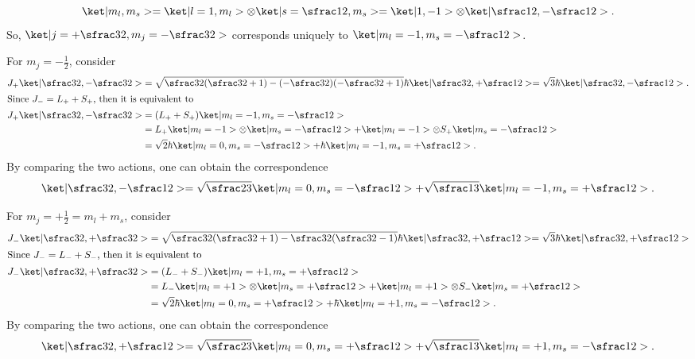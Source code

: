 \begin{solution}
\begin{enumext}
\begin{enumext}
\begin{enumext}[label = \arabic*.]
        \[
          \ket|m_l, m_s> = \ket|l = 1, m_l> \otimes \ket|s = \sfrac12, m_s>
        = \ket|1, -1> \otimes \ket|\sfrac12, -\sfrac12>.
        \]
        So, $\ket|j = +\sfrac32, m_j = -\sfrac32>$ corresponds uniquely to
        $\ket|m_l = -1, m_s = -\sfrac12>$.
        \item For $m_j = -\frac12$, consider
        \begin{align*}
          J_+\ket|\sfrac32, -\sfrac32> &
        = \sqrt{\sfrac32(\sfrac32 + 1) - (-\sfrac32)(-\sfrac32 + 1)} \hbar
          \ket|\sfrac32, +\sfrac12>
        = \sqrt3 \hbar \ket|\sfrac32, -\sfrac12>.\\
        \intertext{Since $J_- = L_+ + S_+$, then it is equivalent to}
          J_+\ket|\sfrac32, -\sfrac32>
      & = (L_+ + S_+) \ket|m_l = -1, m_s = -\sfrac12>\\
      & = L_+ \ket|m_l = -1> \otimes \ket|m_s = -\sfrac12>
          + \ket|m_l = -1> \otimes S_+ \ket|m_s = -\sfrac12>\\
      & = \sqrt2\hbar\ket|m_l = 0, m_s = -\sfrac12>
              + \hbar\ket|m_l = -1, m_s = +\sfrac12>.
        \end{align*}
        By comparing the two actions, one can obtain the correspondence
        \[
          \ket|\sfrac32, -\sfrac12>
        = \sqrt{\sfrac23} \ket|m_l = 0, m_s = -\sfrac12>
          + \sqrt{\sfrac13} \ket|m_l = -1, m_s = +\sfrac12>.
        \]
        \item For $m_j = +\frac12 = m_l + m_s$, consider
        \begin{align*}
          J_-\ket|\sfrac32, +\sfrac32> &
        = \sqrt{\sfrac32(\sfrac32 + 1) - \sfrac32(\sfrac32 - 1)} \hbar
          \ket|\sfrac32, +\sfrac12>
        = \sqrt3 \hbar \ket|\sfrac32, +\sfrac12>\\
        \intertext{Since $J_- = L_- + S_-$, then it is equivalent to}
          J_-\ket|\sfrac32,+\sfrac32>
      & = (L_- + S_-) \ket|m_l = +1, m_s = +\sfrac12>\\
      & = L_- \ket|m_l = +1> \otimes \ket|m_s = +\sfrac12>
          + \ket|m_l = +1> \otimes S_- \ket|m_s = +\sfrac12>\\
      & = \sqrt2\hbar\ket|m_l = 0, m_s = +\sfrac12>
              + \hbar\ket|m_l = +1, m_s = -\sfrac12>.
        \end{align*}
        By comparing the two actions, one can obtain the correspondence
        \[
          \ket|\sfrac32, +\sfrac12>
        = \sqrt{\sfrac23} \ket|m_l = 0, m_s = +\sfrac12>
          + \sqrt{\sfrac13} \ket|m_l = +1, m_s = -\sfrac12>.
\]
\end{enumext}
\end{enumext}
\end{enumext}
\end{solution}
